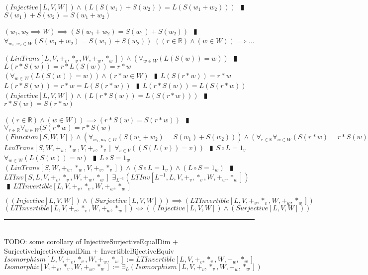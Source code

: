 \documentclass{book}
\newcommand{\abr}{:=}
\newcommand{\pipe}{$\phantom{(}\vrectangleblack\phantom{)}$}
\newcommand{\pr}[1]{\left(#1\right)}
\begin{document}
\begin{enumerate}
\begin{enumerate}
\begin{enumerate}
      \lit $(Injective[L, V, W]) \land \pr{L\pr{S(w_1) + S(w_2)} = L\pr{S(w_1 + w_2)}}$ \pipe $S(w_1) + S(w_2) = S(w_1 + w_2)$
    \end{enumerate}
    \lit $(w_1, w_2 \implies W) \implies \pr{S(w_1 + w_2) = S(w_1) + S(w_2)}$ \pipe $\forall_{w_1, w_2 \in W}\pr{S(w_1 + w_2) = S(w_1) + S(w_2)}$
    \lit $\pr{(r \in \mathbb{R}) \land (w \in W)} \implies \ldots$
    \begin{enumerate}
      \lit $(LinTrans[L, V, +_v, *_v, W, +_w, *_w]) \land \pr{\forall_{w \in W}\pr{L\pr{S(w)} = w}}$ \pipe $L\pr{r * S(w)} = r * L\pr{S(w)} = r * w$
      \lit $\pr{\forall_{w \in W}\pr{L\pr{S(w)} = w}} \land (r * w \in W)$ \pipe $L\pr{S(r * w)} = r * w$
      \lit $L\pr{r * S(w)} = r * w = L\pr{S(r * w)}$ \pipe $L\pr{r * S(w)} = L\pr{S(r * w)}$
      \lit $(Injective[L, V, W]) \land \pr{L\pr{r * S(w)} = L\pr{S(r * w)}}$ \pipe $r * S(w) = S(r * w)$
    \end{enumerate}
    \lit $\pr{(r \in \mathbb{R}) \land (w \in W)} \implies \pr{r * S(w) = S(r * w)}$ \pipe $\forall_{r \in \mathbb{R}} \forall_{w \in W}(S(r * w) = r * S(w)$
    \lit $(Function[S, W, V]) \land \pr{\forall_{w_1, w_2 \in W}\pr{S(w_1 + w_2) = S(w_1) + S(w_2)}} \land \pr{\forall_{r \in \mathbb{R}} \forall_{w \in W}\pr{S(r * w) = r * S(w)}}$
    \lit $LinTrans[S, W, +_w, *_w, V, +_v, *_v]$
    \lit $\forall_{v \in V}\pr{\pr{S\pr{L(v)} = v}}$ \pipe $S \circ L = 1_v$
    \lit $\forall_{w \in W}\pr{L\pr{S(w)} = w}$ \pipe $L \circ S = 1_w$
    \lit $(LinTrans[S, W, +_w, *_w, V, +_v, *_v]) \land (S \circ L = 1_v) \land (L \circ S = 1_w)$ \pipe $LTInv[S, L, V, +_v, *_v, W, +_w, *_w]$
    \lit $\exists_{L^{-1}}(LTInv[L^{-1}, L, V, +_v, *_v, W, +_w, *_w])$ \pipe $LTInvertible[L, V, +_v, *_v, W, +_w, *_w]$
  \end{enumerate}
  \lit $\pr{(Injective[L, V, W]) \land (Surjective[L, V, W])} \implies (LTInvertible[L, V, +_v, *_v, W, +_w, *_w])$
  \lit $(LTInvertible[L, V, +_v, *_v, W, +_w, *_w]) \iff \pr{(Injective[L, V, W]) \land (Surjective[L, V, W])}$
\end{enumerate} \vspace{.75mm} \hrule \vspace{.75mm} \ \\ 

TODO: some corollary of InjectiveSurjectiveEqualDim + SurjectiveInjectiveEqualDim + InvertibleBijectiveEquiv \\

$Isomorphism[L, V, +_v, *_v, W, +_w, *_w] \abr LTInvertible[L, V, +_v, *_v, W, +_w, *_w]$ \\
$Isomorphic[V, +_v, *_v, W, +_w, *_w] \abr \exists_{L}(Isomorphism[L, V, +_v, *_v, W, +_w, *_w])$ \\
\end{document}

